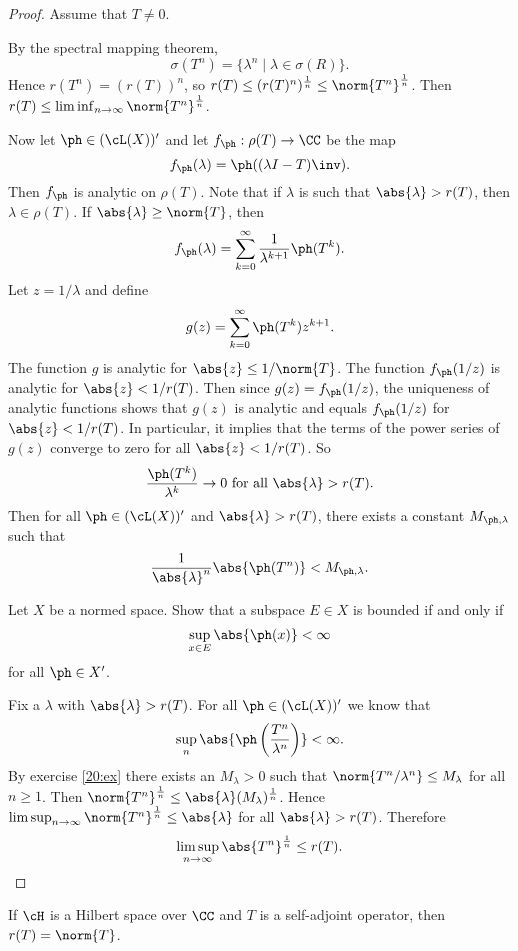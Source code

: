 \begin{proof}
  Assume that $T \neq 0$.

  By the spectral mapping theorem,
  \[ \sigma(T^n) = \{ \lambda^n \mid \lambda \in \sigma(R) \}. \]
  Hence $r(T^n) = (r(T))^n$, so $r(T) \leq (r(T)^n)^\frac 1n \leq \norm{T^n}^\frac 1n$.
  Then $r(T) \leq \liminf_{n\to\infty} \norm{T^n}^\frac 1n$.

  Now let $\ph \in (\cL(X))'$ and let $f_\ph: \rho(T) \to \CC$ be the map
  \[ f_\ph(\lambda) = \ph( (\lambda I-T)\inv ). \]
  Then $f_\ph$ is analytic on $\rho(T)$.
  Note that if $\lambda$ is such that $\abs{\lambda}>r(T)$, then $\lambda \in \rho(T)$.
  If $\abs{\lambda} \geq \norm{T}$, then
  \[ f_\ph(\lambda) = \sum_{k=0}^\infty \frac{1}{\lambda^{k+1}}\ph(T^k). \]
  Let $z=1/\lambda$ and define
  \[ g(z) = \sum_{k=0}^\infty \ph(T^k) z^{k+1}. \]
  The function $g$ is analytic for $\abs{z} \leq 1/\norm{T}$.
  The function $f_\ph(1/z)$ is analytic for $\abs{z} < 1/r(T)$.
  Then since $g(z) = f_\ph(1/z)$, the uniqueness of analytic functions shows that $g(z)$ is analytic and equals $f_\ph(1/z)$ for $\abs{z}<1/r(T)$.
  In particular, it implies that the terms of the power series of $g(z)$ converge to zero for all $\abs{z}<1/r(T)$.
  So
  \[ \frac{\ph(T^k)}{\lambda^k} \to 0 \text{ for all } \abs{\lambda}>r(T). \]
  Then for all $\ph \in (\cL(X))'$ and $\abs{\lambda}>r(T)$, there exists a constant $M_{\ph,\lambda}$ such that
  \[ \frac{1}{\abs{\lambda}^n}\abs{\ph(T^n)} < M_{\ph,\lambda}. \]

  \begin{exer}\label{20:ex}
    Let $X$ be a normed space.
    Show that a subspace $E \in X$ is bounded if and only if
    \[ \sup_{x \in E} \abs{\ph(x)} < \infty \]
    for all $\ph \in X'$.
  \end{exer}

  Fix a $\lambda$ with $\abs{\lambda}>r(T)$.
  For all $\ph \in (\cL(X))'$ we know that
  \[ \sup_n \abs{\ph\left( \frac{T^n}{\lambda^n} \right)}<\infty. \]
  By exercise \ref{20:ex} there exists an $M_\lambda>0$ such that $\norm{T^n/\lambda^n}\leq M_\lambda$ for all $n \geq 1$.
  Then $\norm{T^n}^\frac 1n \leq \abs{\lambda}(M_\lambda)^\frac 1n$.
  Hence $\limsup_{n\to\infty} \norm{T^n}^\frac 1n \leq \abs{\lambda}$ for all $\abs{\lambda}>r(T)$.
  Therefore
  \[ \limsup_{n\to\infty}\abs{T^n}^\frac 1n \leq r(T). \qedhere \]
\end{proof}

\begin{exer}
  If $\cH$ is a Hilbert space over $\CC$ and $T$ is a self-adjoint operator, then $r(T)=\norm{T}$.
\end{exer}

